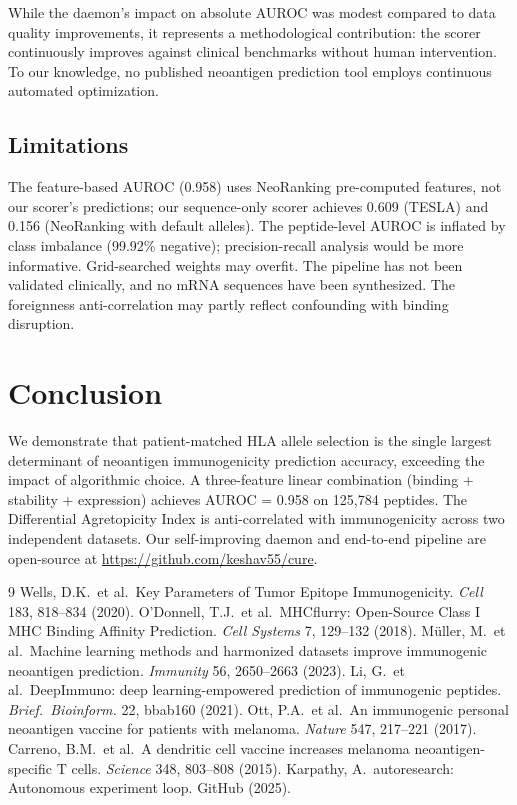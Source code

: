 \documentclass[11pt,twocolumn]{article}
\begin{document}
While the daemon's impact on absolute AUROC was modest compared to data quality improvements, it represents a methodological contribution: the scorer continuously improves against clinical benchmarks without human intervention. To our knowledge, no published neoantigen prediction tool employs continuous automated optimization.

\subsection{Limitations}

The feature-based AUROC (0.958) uses NeoRanking pre-computed features, not our scorer's predictions; our sequence-only scorer achieves 0.609 (TESLA) and 0.156 (NeoRanking with default alleles). The peptide-level AUROC is inflated by class imbalance (99.92\% negative); precision-recall analysis would be more informative. Grid-searched weights may overfit. The pipeline has not been validated clinically, and no mRNA sequences have been synthesized. The foreignness anti-correlation may partly reflect confounding with binding disruption.

\section{Conclusion}

We demonstrate that patient-matched HLA allele selection is the single largest determinant of neoantigen immunogenicity prediction accuracy, exceeding the impact of algorithmic choice. A three-feature linear combination (binding + stability + expression) achieves AUROC = 0.958 on 125,784 peptides. The Differential Agretopicity Index is anti-correlated with immunogenicity across two independent datasets. Our self-improving daemon and end-to-end pipeline are open-source at \url{https://github.com/keshav55/cure}.

\begin{thebibliography}{9}
 Wells, D.K.\ et al.\ Key Parameters of Tumor Epitope Immunogenicity. \textit{Cell} 183, 818--834 (2020).
 O'Donnell, T.J.\ et al.\ MHCflurry: Open-Source Class I MHC Binding Affinity Prediction. \textit{Cell Systems} 7, 129--132 (2018).
 M\"{u}ller, M.\ et al.\ Machine learning methods and harmonized datasets improve immunogenic neoantigen prediction. \textit{Immunity} 56, 2650--2663 (2023).
 Li, G.\ et al.\ DeepImmuno: deep learning-empowered prediction of immunogenic peptides. \textit{Brief.\ Bioinform.} 22, bbab160 (2021).
 Ott, P.A.\ et al.\ An immunogenic personal neoantigen vaccine for patients with melanoma. \textit{Nature} 547, 217--221 (2017).
 Carreno, B.M.\ et al.\ A dendritic cell vaccine increases melanoma neoantigen-specific T cells. \textit{Science} 348, 803--808 (2015).
 Karpathy, A.\ autoresearch: Autonomous experiment loop. GitHub (2025).
\end{thebibliography}
\end{document}
